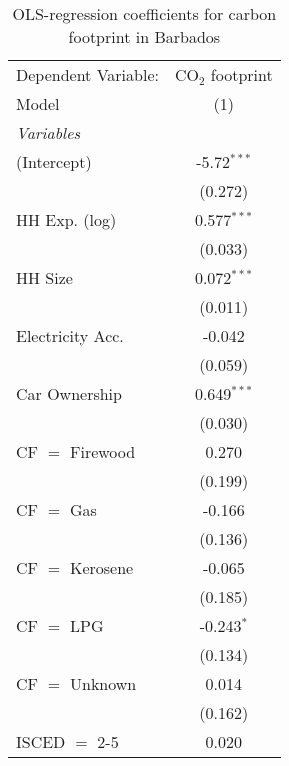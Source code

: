 
\begin{table}[htbp!]
   \centering
   \small
   \begin{adjustbox}{width = 1\textwidth, max height = 0.95\textheight, center}
      \begin{threeparttable}[b]
         \caption{\label{tab:OLS_2_BRB} OLS-regression coefficients for carbon footprint in Barbados}
         \begin{tabular}{lc}
            \tabularnewline \midrule \midrule
            Dependent Variable: & CO$_{2}$ footprint\\  
            Model               & (1)\\  
            \midrule
            \emph{Variables}\\
            (Intercept)         & -5.72$^{***}$\\   
                                & (0.272)\\   
            HH Exp. (log)       & 0.577$^{***}$\\   
                                & (0.033)\\   
            HH Size             & 0.072$^{***}$\\   
                                & (0.011)\\   
            Electricity Acc.    & -0.042\\   
                                & (0.059)\\   
            Car Ownership       & 0.649$^{***}$\\   
                                & (0.030)\\   
            CF $=$ Firewood     & 0.270\\   
                                & (0.199)\\   
            CF $=$ Gas          & -0.166\\   
                                & (0.136)\\   
            CF $=$ Kerosene     & -0.065\\   
                                & (0.185)\\   
            CF $=$ LPG          & -0.243$^{*}$\\   
                                & (0.134)\\   
            CF $=$ Unknown      & 0.014\\   
                                & (0.162)\\   
            ISCED $=$ 2-5       & 0.020\\   

\end{tabular}
\end{threeparttable}
\end{adjustbox}
\end{table}
